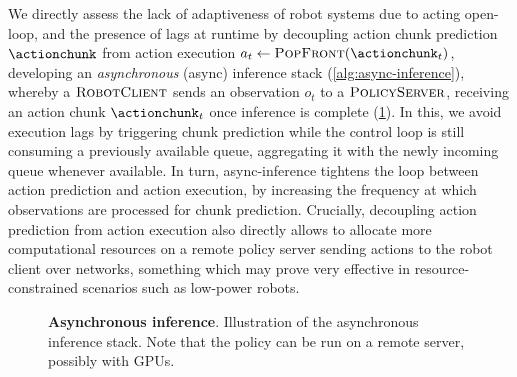 We directly assess the lack of adaptiveness of robot systems due to acting open-loop, and the presence of lags at runtime by decoupling action chunk prediction \( \actionchunk \) from action execution \( a_t \gets \textsc{PopFront}(\actionchunk_t) \), developing an \textit{asynchronous} (async) inference stack (\ref{alg:async-inference}), whereby a \( \textsc{RobotClient} \) sends an observation \( o_t \) to a \( \textsc{PolicyServer} \), receiving an action chunk \( \actionchunk_t \) once inference is complete (\ref{fig:async-inference}).
In this, we avoid execution lags by triggering chunk prediction while the control loop is still consuming a previously available queue, aggregating it with the newly incoming queue whenever available.
In turn, async-inference tightens the loop between action prediction and action execution, by increasing the frequency at which observations are processed for chunk prediction. 
Crucially, decoupling action prediction from action execution also directly allows to allocate more computational resources on a remote policy server sending actions to the robot client over networks, something which may prove very effective in resource-constrained scenarios such as low-power robots.

\begin{figure}
    \centering
    \begin{minipage}[t]{\textwidth}
        \centering
        \caption{\textbf{Asynchronous inference}. Illustration of the asynchronous inference stack. Note that the policy can be run on a remote server, possibly with GPUs.}
        \label{fig:async-inference}
    \end{minipage}
    \vspace{-0.6cm}
\end{figure}

